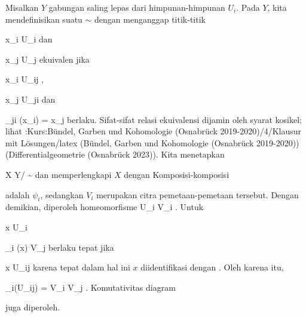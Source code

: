 {

Misalkan $Y$ gabungan saling lepas dari himpunan-himpunan $U_i$. Pada $Y$, kita mendefinisikan suatu
$\sim$ dengan menganggap titik-titik

\mavergleichskette
{\vergleichskette
{ x_i
}
{ \in }{ U_i
}
{  }{
}
{    }{
}
{   }{
}
}
{}{}{}
dan

\mavergleichskette
{\vergleichskette
{ x_j
}
{ \in }{ U_j
}
{  }{
}
{    }{
}
{   }{
}
}
{}{}{}
ekuivalen jika

\mavergleichskette
{\vergleichskette
{ x_i
}
{ \in }{ U_{ij}
}
{  }{
}
{    }{
}
{   }{
}
}
{}{}{,}

\mavergleichskette
{\vergleichskette
{ x_j
}
{ \in }{ U_{ji}
}
{  }{
}
{    }{
}
{   }{
}
}
{}{}{}
dan

\mavergleichskette
{\vergleichskette
{ \varphi_{ji} (x_i)
}
{ = }{ x_j
}
{  }{
}
{    }{
}
{   }{
}
}
{}{}{}
berlaku. Sifat-sifat relasi ekuivalensi dijamin oleh syarat kosikel; lihat
:Kurs:Bündel, Garben und Kohomologie (Osnabrück 2019-2020)/4/Klausur mit Lösungen/latex (Bündel, Garben und Kohomologie (Osnabrück 2019-2020))
(Differentialgeometrie (Osnabrück 2023)).
Kita menetapkan

\mavergleichskettedisp
{\vergleichskette
{X
}
{ } { Y/ \sim
}
{ } {
}
{ } {
}
{ } {
}
}
{}{}{}
dan memperlengkapi $X$ dengan
Komposisi-komposisi

 {  }

adalah $\psi_i$, sedangkan $V_i$ merupakan citra pemetaan-pemetaan tersebut. Dengan demikian, diperoleh homeomorfisme
 {U_i } { V_i
} {}
. Untuk

\mavergleichskette
{\vergleichskette
{ x
}
{ \in }{ U_i
}
{  }{
}
{    }{
}
{   }{
}
}
{}{}{}

\mavergleichskettedisp
{\vergleichskette
{ \psi_i (x)
}
{ \in} { V_j
}
{ } {
}
{ } {
}
{ } {
}
}
{}{}{}
berlaku tepat jika

\mavergleichskette
{\vergleichskette
{ x
}
{ \in }{ U_{ij}
}
{  }{
}
{    }{
}
{   }{
}
}
{}{}{}
karena tepat dalam hal ini $x$ diidentifikasi dengan
. Oleh karena itu,

\mavergleichskette
{\vergleichskette
{ \psi_i(U_{ij})
}
{ = }{ V_i \cap V_j
}
{  }{
}
{    }{
}
{   }{
}
}
{}{}{.}
Komutativitas diagram

 {  }

juga diperoleh.

 }



